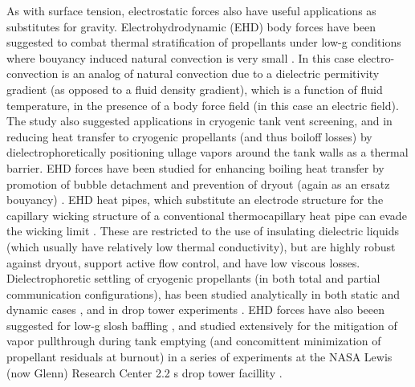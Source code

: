 \documentclass[10pt,a4paper]{article}
\begin{document}
As with surface tension, electrostatic forces also have useful applications as substitutes for gravity. Electrohydrodynamic (EHD) body forces have been suggested to combat thermal stratification of propellants under low-g conditions where bouyancy induced natural convection is very small \cite{blackmon_collection_1965}. In this case electro-convection is an analog of natural convection due to a dielectric permitivity gradient (as opposed to a fluid density gradient), which is a function of fluid temperature, in the presence of a body force field (in this case an electric field). The study also suggested applications in cryogenic tank vent screening, and in reducing heat transfer to cryogenic propellants (and thus boiloff losses) by dielectrophoretically positioning ullage vapors around the tank walls as a thermal barrier. EHD forces have been studied for enhancing boiling heat transfer by promotion of bubble detachment and prevention of dryout (again as an ersatz bouyancy) \cite{snyder_dielectrophoresis_2001} \cite{di_marco_influence_2003} \cite{marco_use_2012}. EHD heat pipes, which substitute an electrode structure for the capillary wicking structure of a conventional thermocapillary heat pipe can evade the wicking limit \cite{jones_electrohydrodynamic_1973}. These are restricted to the use of insulating dielectric liquids (which usually have relatively low thermal conductivity), but are highly robust against dryout, support active flow control, and have low viscous losses. Dielectrophoretic settling of cryogenic propellants (in both total and partial communication configurations), has been studied analytically in both static \cite{hurwitz_electrohydrodynamic_1966} and dynamic cases \cite{koval_dynamics_1967}, and in drop tower experiments \cite{fax_dielectrophoretic_1969}. EHD forces have also beeen suggested for low-g slosh baffling \cite{boretz_orbital_1970} \cite{petrash_use_1968} \cite{hurwitz_dielectrophoretic_1968}, and studied extensively for the mitigation of vapor pullthrough during tank emptying (and concomittent minimization of propellant residuals at burnout) in a series of experiments at the NASA Lewis (now Glenn) Research Center 2.2 s drop tower facillity \cite{berenyi_dielectrophoretic_1970}. 
\end{document}

